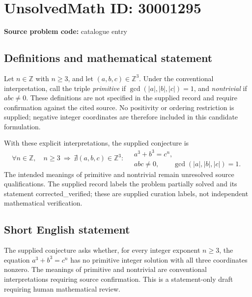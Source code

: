 \documentclass[11pt]{article}
\newcommand{\Z}{\mathbb{Z}}
\begin{document}
\section*{UnsolvedMath ID: 30001295}
\textbf{Source problem code:} catalogue entry
\subsection{Definitions and mathematical statement}
Let \(n\in\Z\) with \(n\geq 3\), and let \((a,b,c)\in\Z^3\). Under the conventional interpretation, call the triple \emph{primitive} if \(\gcd(|a|,|b|,|c|)=1\), and \emph{nontrivial} if \(abc\neq 0\). These definitions are not specified in the supplied record and require confirmation against the cited source. No positivity or ordering restriction is supplied; negative integer coordinates are therefore included in this candidate formulation.

With these explicit interpretations, the supplied conjecture is
\[
\forall n\in\Z,\quad n\geq 3\ \Longrightarrow\ \nexists(a,b,c)\in\Z^3:\quad
\begin{gathered}
a^3+b^3=c^n,\\
abc\neq 0,\qquad \gcd(|a|,|b|,|c|)=1.
\end{gathered}
\]
The intended meanings of primitive and nontrivial remain unresolved source qualifications. The supplied record labels the problem partially solved and its statement corrected\_verified; these are supplied curation labels, not independent mathematical verification.
\subsection{Short English statement}
The supplied conjecture asks whether, for every integer exponent \(n\geq 3\), the equation \(a^3+b^3=c^n\) has no primitive integer solution with all three coordinates nonzero. The meanings of primitive and nontrivial are conventional interpretations requiring source confirmation. This is a statement-only draft requiring human mathematical review.
\end{document}
